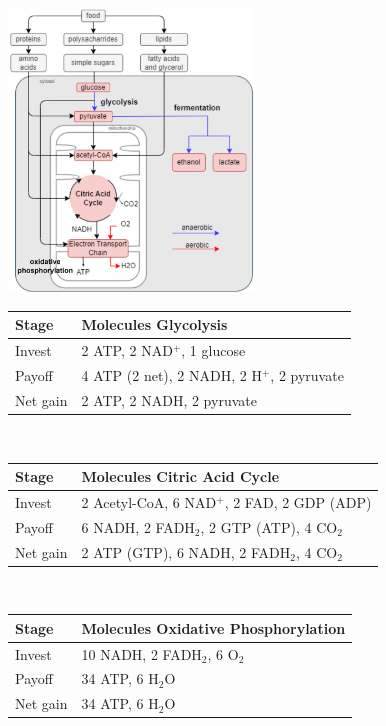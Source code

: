 \includegraphics[width=65mm]{src/Images/glucose_metabolism.png}\\ 

\begin{tabular}{l p{5cm}}
\textbf{Stage} & \textbf{Molecules} \hfill \textbf{Glycolysis}\\
\hline
Invest   & 2 ATP, 2 NAD\(^+\), 1 glucose \\
Payoff   & 4 ATP (2 net), 2 NADH, 2 H\(^+\), 2 pyruvate \\
Net gain & 2 ATP, 2 NADH, 2 pyruvate \\
\hline
\end{tabular}\\

\begin{tabular}{l p{5cm}}
\textbf{Stage} & \textbf{Molecules} \hfill \textbf{Citric Acid Cycle}\\
\hline
Invest   & 2 Acetyl-CoA, 6 NAD\(^+\), 2 FAD, 2 GDP (ADP) \\
Payoff   & 6 NADH, 2 FADH\(_2\), 2 GTP (ATP), 4 CO\(_2\) \\
Net gain & 2 ATP (GTP), 6 NADH, 2 FADH\(_2\), 4 CO\(_2\) \\
\hline
\end{tabular}\\
\begin{tabular}{l p{5cm}}
\textbf{Stage} & \textbf{Molecules} \hfill \textbf{Oxidative Phosphorylation}\\
\hline
Invest   & 10 NADH, 2 FADH\(_2\), 6 O\(_2\) \\
Payoff   & 34 ATP, 6 H\(_2\)O \\
Net gain & 34 ATP, 6 H\(_2\)O \\
\hline
\end{tabular}\\
